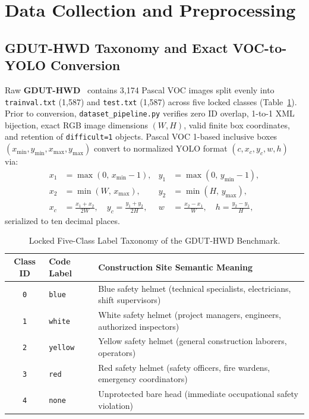 \section{Data Collection and Preprocessing}

\subsection{GDUT-HWD Taxonomy and Exact VOC-to-YOLO Conversion}

Raw \textbf{GDUT-HWD}~\cite{wu2019hardhats} contains 3,174 Pascal VOC images split evenly into \texttt{trainval.txt} (1,587) and \texttt{test.txt} (1,587) across five locked classes (Table~\ref{tab:ch4_taxonomy}). Prior to conversion, \nolinkurl{dataset_pipeline.py} verifies zero ID overlap, 1-to-1 XML bijection, exact RGB image dimensions $(W,H)$, valid finite box coordinates, and retention of \texttt{difficult=1} objects. Pascal VOC 1-based inclusive boxes $(x_{\min}, y_{\min}, x_{\max}, y_{\max})$ convert to normalized YOLO format $(c, x_c, y_c, w, h)$ via:
\begin{align}
x_1 &= \max(0, \, x_{\min} - 1), & y_1 &= \max(0, \, y_{\min} - 1), \nonumber \\
x_2 &= \min(W, \, x_{\max}),     & y_2 &= \min(H, \, y_{\max}), \label{eq:ch4_voc_to_yolo} \\
x_c &= \frac{x_1 + x_2}{2W}, \quad y_c = \frac{y_1 + y_2}{2H}, &
w &= \frac{x_2 - x_1}{W}, \quad h = \frac{y_2 - y_1}{H}, \nonumber
\end{align}
serialized to ten decimal places.

\begin{table}[htbp]
\centering
\caption{Locked Five-Class Label Taxonomy of the GDUT-HWD Benchmark.}
\label{tab:ch4_taxonomy}
\footnotesize
\renewcommand{\arraystretch}{1.12}
\begin{tabularx}{\textwidth}{|c|l|X|}
\hline
\rowcolor{slatehdr}
\textbf{Class ID} & \textbf{Code Label} & \textbf{Construction Site Semantic Meaning} \\
\hline
\texttt{0} & \texttt{blue}   & Blue safety helmet (technical specialists, electricians, shift supervisors) \\ \hline
\texttt{1} & \texttt{white}  & White safety helmet (project managers, engineers, authorized inspectors) \\ \hline
\texttt{2} & \texttt{yellow} & Yellow safety helmet (general construction laborers, operators) \\ \hline
\texttt{3} & \texttt{red}    & Red safety helmet (safety officers, fire wardens, emergency coordinators) \\ \hline
\texttt{4} & \texttt{none}   & Unprotected bare head (immediate occupational safety violation) \\ \hline
\end{tabularx}
\end{table}

